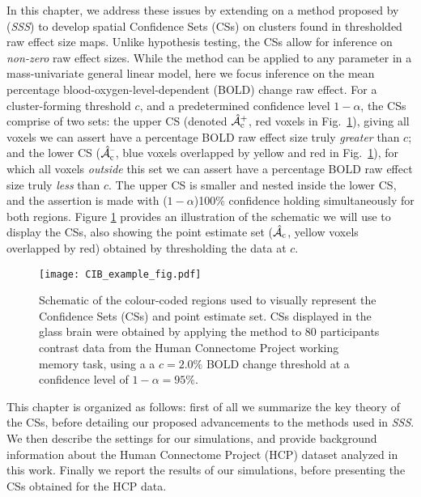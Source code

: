 In this chapter, we address these issues by extending on a method proposed by \citet*{Sommerfeld2018-zl} (\textit{SSS}) to develop spatial Confidence Sets (CSs) on clusters found in thresholded raw effect size maps. Unlike hypothesis testing, the CSs allow for inference on \textit{non-zero} raw effect sizes. While the method can be applied to any parameter in a mass-univariate general linear model, here we focus inference on the mean percentage blood-oxygen-level-dependent (BOLD) change raw effect. For a cluster-forming threshold $c$, and a predetermined confidence level $1-\alpha$, the CSs comprise of two sets: the upper CS (denoted $\operatorname{\hat{\mathcal{A}}_{c}^+}$, red voxels in Fig.\ \ref{fig:example_fig}), giving all voxels we can assert have a percentage BOLD raw effect size truly \textit{greater} than $c$; and the lower CS ($\operatorname{\hat{\mathcal{A}}_{c}^{\textrm{--}}}$, blue voxels overlapped by yellow and red in Fig.\ \ref{fig:example_fig}), for which all voxels \textit{outside} this set we can assert have a percentage BOLD raw effect size truly \textit{less} than $c$. The upper CS is smaller and nested inside the lower CS, and the assertion is made with ($1-\alpha$)100\% confidence holding simultaneously for both regions. Figure \ref{fig:example_fig} provides an illustration of the schematic we will use to display the CSs, also showing the point estimate set ($\operatorname{\hat{\mathcal{A}}_{c}}$, yellow voxels overlapped by red) obtained by thresholding the data at $c$.

\begin{figure}[htbp]
\hspace*{-1.0cm}
\centering
    \texttt{[image: CIB\_example\_fig.pdf]}
\caption{Schematic of the colour-coded regions used to visually represent the Confidence Sets (CSs) and point estimate set. CSs displayed in the glass brain were obtained by applying the method to 80 participants contrast data from the Human Connectome Project working memory task, using a a $c = 2.0\%$ BOLD change threshold at a confidence level of $1 - \alpha = 95\%$.}
\label{fig:example_fig}
\end{figure}


This chapter is organized as follows: first of all we summarize the key theory of the CSs, before detailing our proposed advancements to the methods used in \textit{SSS}. We then describe the settings for our simulations, and provide background information about the Human Connectome Project (HCP) dataset analyzed in this work. Finally we report the results of our simulations, before presenting the CSs obtained for the HCP data. 

